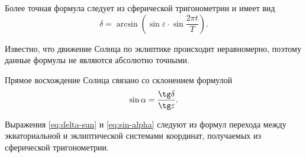 Более точная формула следует из сферической тригонометрии и имеет вид
\begin{equation}
	\delta=\arcsin\left(\sin\varepsilon\cdot\sin \frac{2 \pi t}{T}\right).
	\label{eq:delta-sun}
\end{equation}

Известно, что движение Солнца по эклиптике происходит неравномерно, поэтому данные формулы не являются абсолютно точными.

Прямое восхождение Солнца связано со склонением формулой
\begin{equation}
	\sin\alpha=\frac{\tg\delta}{\tg\varepsilon}.
	\label{eq:sin-alpha}
\end{equation}

Выражения \eqref{eq:delta-sun} и \eqref{eq:sin-alpha} следуют из формул перехода между экваториальной и эклиптической системами координат, получаемых из сферической тригонометрии.
